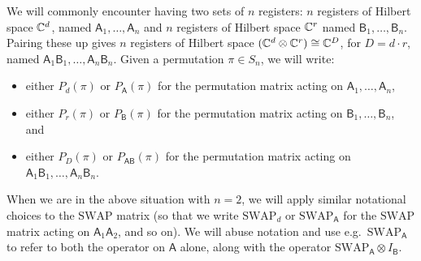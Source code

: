 \documentclass{article}
\newcommand{\swap}{\mathrm{SWAP}}
\newcommand{\reg}[1]{\mathsf{#1}}
\begin{document}
We will commonly encounter having two sets of $n$ registers: $n$ registers of Hilbert space $\mathbb C^d$, named $\reg{A}_1, \ldots, \reg{A}_n$ and $n$ registers of Hilbert space $\mathbb C^r$ named $\reg{B}_1, \ldots, \reg{B}_n$.
Pairing these up gives $n$ registers of Hilbert space $(\mathbb C^d \otimes \mathbb C^r) \cong \mathbb C^D$, for $D = d \cdot r$, named $\reg{A}_1 \reg{B}_1, \ldots, \reg{A}_n \reg{B}_n$.
Given a permutation $\pi \in S_n$,
we will write:
\begin{itemize}
\item[$\circ$] either $P_d(\pi)$ or $P_{\reg{A}}(\pi)$ for the permutation matrix acting on $\reg{A}_1, \ldots, \reg{A}_n$,
\item[$\circ$]  either $P_r(\pi)$ or $P_{\reg{B}}(\pi)$ for the permutation matrix acting on $\reg{B}_1, \ldots, \reg{B}_n$, and
\item[$\circ$]  either $P_D(\pi)$ or $P_{\reg{A}\reg{B}}(\pi)$ for the permutation matrix acting on $\reg{A}_1\reg{B}_1, \ldots, \reg{A}_n\reg{B}_n$.
\end{itemize}
When we are in the above situation with $n = 2$,
we will apply similar notational choices to the $\swap$ matrix
(so that we write $\swap_d$ or $\swap_{\reg{A}}$ for the $\swap$ matrix acting on $\reg{A}_1 \reg{A}_2$, and so on).
We will abuse notation and use e.g.\ $\swap_{\reg{A}}$ to refer to both the operator on $\reg{A}$ alone, along with the operator $\swap_{\reg{A}} \otimes I_\reg{B}$.
\end{document}
